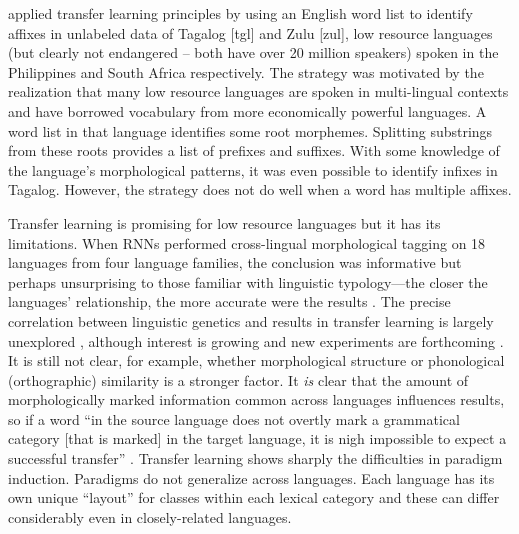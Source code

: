 \documentclass[12pt]{article}
\begin{document}
 applied transfer learning principles by using an English word list to identify affixes in unlabeled data of Tagalog [tgl] and Zulu [zul], low resource languages (but clearly not endangered -- both have over 20 million speakers) spoken in the Philippines and South Africa respectively. The strategy was motivated by the realization that many low resource languages are spoken in multi-lingual contexts and have borrowed vocabulary from more economically powerful languages. A word list in that language identifies some root morphemes. Splitting substrings from these roots provides a list of prefixes and suffixes. With some knowledge of the language's morphological patterns, it was even possible to identify infixes in Tagalog. However, the strategy does not do well when a word has multiple affixes. 

Transfer learning is promising for low resource languages but it has its limitations. When RNNs performed cross-lingual morphological tagging on 18 languages from four language families, the conclusion was informative but perhaps unsurprising to those familiar with linguistic typology—the closer the languages' relationship, the more accurate were the results \cite{cotterell_cross-lingual_2017}. The precise correlation between linguistic genetics and results in transfer learning is largely unexplored \cite{buys_cross-lingual_2016,cotterell_cross-lingual_2017}, although interest is growing and new experiments are forthcoming \cite{sigmorphon2019}.  It is still not clear, for example, whether morphological structure or phonological (orthographic) similarity is a stronger factor. It \textit{is} clear that the amount of morphologically marked information common across languages influences results, so if a word ``in the source language does not overtly mark a grammatical category [that is marked] in the target language, it is nigh impossible to expect a successful transfer'' \cite[page749]{cotterell_cross-lingual_2017}. Transfer learning shows sharply the difficulties in paradigm induction.  Paradigms do not generalize across languages. Each language has its own unique ``layout'' for classes within each lexical category and these can differ considerably even in closely-related languages.
\end{document}
